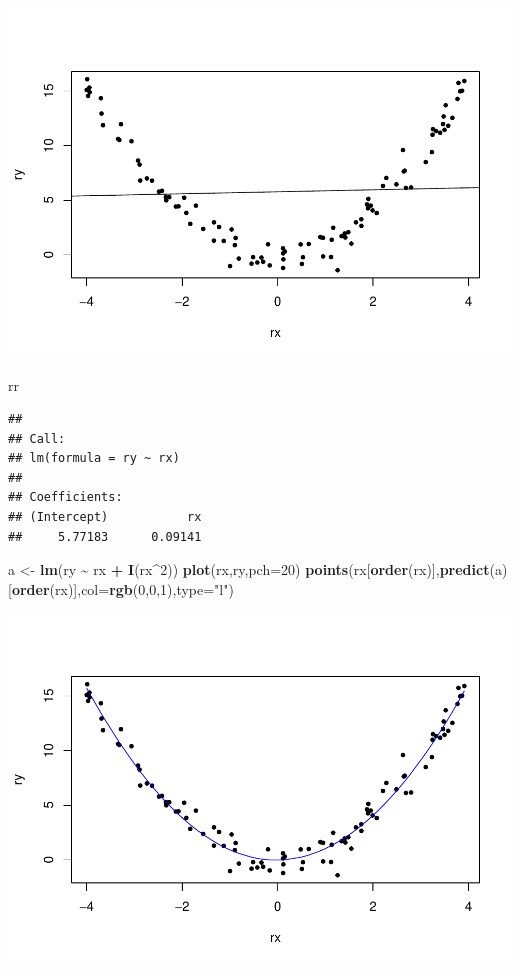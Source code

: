\documentclass[
]{book}
\newenvironment{Shaded}{\begin{snugshade}}{\end{snugshade}}
\newcommand{\AttributeTok}[1]{\textcolor[rgb]{0.13,0.29,0.53}{#1}}
\newcommand{\DecValTok}[1]{\textcolor[rgb]{0.00,0.00,0.81}{#1}}
\newcommand{\FunctionTok}[1]{\textcolor[rgb]{0.13,0.29,0.53}{\textbf{#1}}}
\newcommand{\NormalTok}[1]{#1}
\newcommand{\OtherTok}[1]{\textcolor[rgb]{0.56,0.35,0.01}{#1}}
\newcommand{\SpecialCharTok}[1]{\textcolor[rgb]{0.81,0.36,0.00}{\textbf{#1}}}
\newcommand{\StringTok}[1]{\textcolor[rgb]{0.31,0.60,0.02}{#1}}
\begin{document}
\includegraphics{_main_files/figure-latex/unnamed-chunk-22-1.pdf}

\begin{Shaded}
\begin{Highlighting}[]
\NormalTok{rr}
\end{Highlighting}
\end{Shaded}

\begin{verbatim}
## 
## Call:
## lm(formula = ry ~ rx)
## 
## Coefficients:
## (Intercept)           rx  
##     5.77183      0.09141
\end{verbatim}

\begin{Shaded}
\begin{Highlighting}[]
\NormalTok{a }\OtherTok{\textless{}{-}} \FunctionTok{lm}\NormalTok{(ry }\SpecialCharTok{\textasciitilde{}}\NormalTok{ rx }\SpecialCharTok{+} \FunctionTok{I}\NormalTok{(rx}\SpecialCharTok{\^{}}\DecValTok{2}\NormalTok{))}
\FunctionTok{plot}\NormalTok{(rx,ry,}\AttributeTok{pch=}\DecValTok{20}\NormalTok{)}
\FunctionTok{points}\NormalTok{(rx[}\FunctionTok{order}\NormalTok{(rx)],}\FunctionTok{predict}\NormalTok{(a)[}\FunctionTok{order}\NormalTok{(rx)],}\AttributeTok{col=}\FunctionTok{rgb}\NormalTok{(}\DecValTok{0}\NormalTok{,}\DecValTok{0}\NormalTok{,}\DecValTok{1}\NormalTok{),}\AttributeTok{type=}\StringTok{"l"}\NormalTok{)}
\end{Highlighting}
\end{Shaded}

\includegraphics{_main_files/figure-latex/unnamed-chunk-24-1.pdf}
\end{document}
